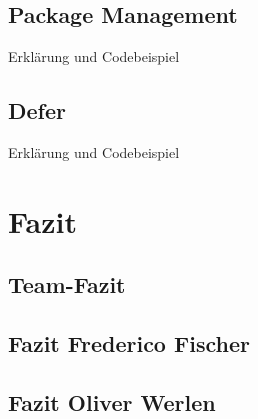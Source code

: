 \documentclass[12pt,titlepage]{article}
\begin{document}
\subsection{Package Management}
Erklärung und Codebeispiel


\subsection{Defer}
Erklärung und Codebeispiel

\section{Fazit}
\subsection{Team-Fazit}

\subsection{Fazit Frederico Fischer}

\subsection{Fazit Oliver Werlen}

    
\end{document}
